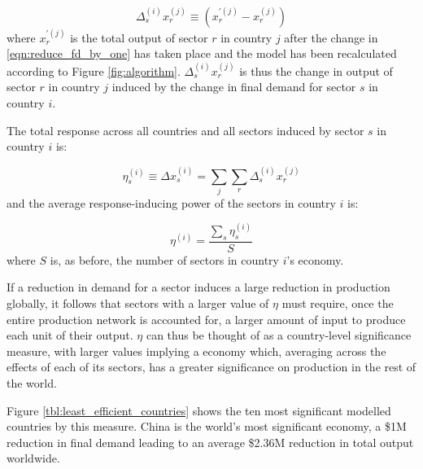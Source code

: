 \documentclass{article}
\begin{document}
\begin{equation}
    \Delta_{s}^{(i)} x_{r}^{(j)} \equiv (x_{r}^{\prime(j)} - x_r^{(j)})
\end{equation}
where $x_{r}^{\prime(j)}$ is the total output of sector $r$ in country $j$ after the change in \cref{eqn:reduce_fd_by_one} has taken place and the model has been recalculated according to Figure \ref{fig:algorithm}.
$\Delta_{s}^{(i)} x_{r}^{(j)}$ is thus the change in output of sector $r$ in country $j$ induced by the change in final demand for sector $s$ in country $i$.

The total response across all countries and all sectors induced by sector $s$ in country $i$ is:

\begin{equation}
    \eta_s^{(i)} \equiv \Delta x_{s}^{(i)} = \sum_j \sum_r \Delta_{s}^{(i)} x_{r}^{(j)}
\end{equation}
and the average response-inducing power of the sectors in country $i$ is:

\begin{equation}
    \eta^{(i)} = \frac{\sum_s \eta_s^{(i)}}{S}
\end{equation}
where $S$ is, as before, the number of sectors in country $i$'s economy.

If a reduction in demand for a sector induces a large reduction in production globally, it follows that sectors with a larger value of $\eta$ must require, once the entire production network is accounted for, a larger amount of input to produce each unit of their output.
$\eta$ can thus be thought of as a country-level significance measure, with larger values implying a economy which, averaging across the effects of each of its sectors, has a greater significance on production in the rest of the world.

Figure \ref{tbl:least_efficient_countries} shows the ten most significant modelled countries by this measure.
China is the world's most significant economy, a \$1M reduction in final demand leading to an average \$2.36M reduction in total output worldwide.
\end{document}
